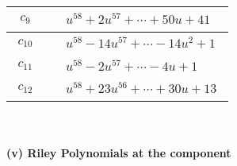 \documentclass[1p]{elsarticle_modified}
\theoremstyle{definition}
\begin{document}
\begin{tabular}{m{50pt}|m{274pt}}
\hline $$\begin{aligned}c_{9}\end{aligned}$$&$\begin{aligned}
&u^{58}+2 u^{57}+\cdots+50 u+41
\end{aligned}$\\
\hline $$\begin{aligned}c_{10}\end{aligned}$$&$\begin{aligned}
&u^{58}-14 u^{57}+\cdots-14 u^2+1
\end{aligned}$\\
\hline $$\begin{aligned}c_{11}\end{aligned}$$&$\begin{aligned}
&u^{58}-2 u^{57}+\cdots-4 u+1
\end{aligned}$\\
\hline $$\begin{aligned}c_{12}\end{aligned}$$&$\begin{aligned}
&u^{58}+23 u^{56}+\cdots+30 u+13
\end{aligned}$\\
\hline
\end{tabular}\\~\\
\newpage\renewcommand{\arraystretch}{1}
\flushleft \textbf{(v) Riley Polynomials at the component}\newline \\
\end{document}
